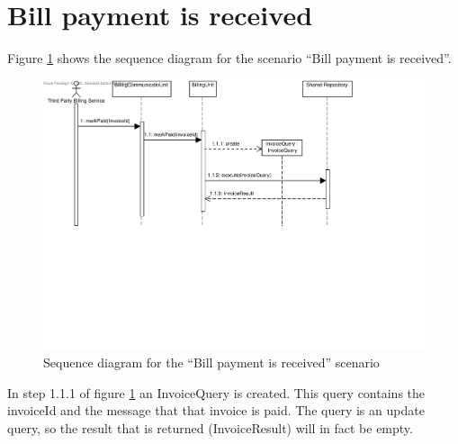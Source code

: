 \section{Bill payment is received}
\label{scenario:bill-paid}

\npar Figure \ref{fig:scenario-5-14} shows the sequence diagram for the scenario
``Bill payment is received''.

\begin{figure}[H]
	\begin{centering}
		\includegraphics[width=\textwidth]{figs/scenario-5-14.pdf}
		\caption{Sequence diagram for the ``Bill payment is received'' scenario}
		\label{fig:scenario-5-14}
	\end{centering}
\end{figure}

\npar In step 1.1.1 of figure \ref{fig:scenario-5-14} an InvoiceQuery is
created. This query contains the invoiceId and the message that that invoice is
paid. The query is an update query, so the result that is returned
(InvoiceResult) will in fact be empty.
